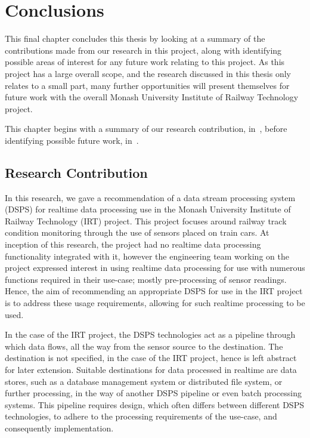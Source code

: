 \chapter{Conclusions}
\label{sec:conclusion}

This final chapter concludes this thesis by looking at a summary of the contributions made from our research in this
project, along with identifying possible areas of interest for any future work relating to this project. As this project
has a large overall scope, and the research discussed in this thesis only relates to a small part, many further opportunities
will present themselves for future work with the overall Monash University Institute of Railway Technology project.

This chapter begins with a summary of our research contribution, in~, before identifying
possible future work, in~.

\section{Research Contribution} %
\label{sub:research_contribution}

In this research, we gave a recommendation of a data stream processing system (DSPS) for realtime data processing use in the
Monash University Institute of Railway Technology (IRT) project. This project focuses around railway track condition monitoring
through the use of sensors placed on train cars. At inception of this research, the project had no realtime data processing
functionality integrated with it, however the engineering team working on the project expressed interest in using realtime
data processing for use with numerous functions required in their use-case; mostly pre-processing of sensor readings. Hence,
the aim of recommending an appropriate DSPS for use in the IRT project is to address these usage requirements, allowing
for such realtime processing to be used.

In the case of the IRT project, the DSPS technologies act as a pipeline through which data flows, all the way from the
sensor source to the destination. The destination is not specified, in the case of the IRT project, hence is left abstract for later extension. Suitable
destinations for data processed in realtime are data stores, such as a database management system or distributed file system,
or further processing, in the way of another DSPS pipeline or even batch processing systems. This pipeline requires design,
which often differs between different DSPS technologies, to adhere to the processing requirements of the use-case, and
consequently implementation.

